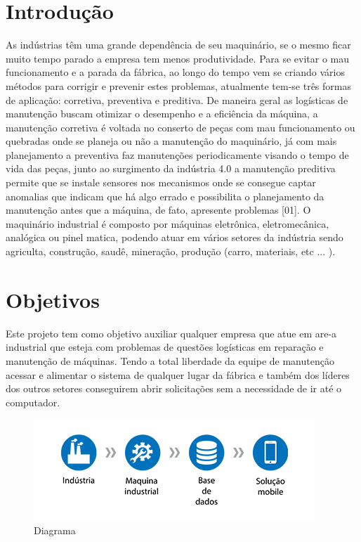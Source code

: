 \documentclass[%
  a4paper,%
  12pt,%
  english,%
  brazilian,%
]{article}
\begin{document}
\section{Introdução}%
As indústrias têm uma grande dependência de seu maquinário, se o mesmo ficar muito tempo parado a empresa tem menos produtividade. Para se evitar o mau funcionamento e a parada da fábrica, ao longo do tempo vem se criando vários métodos para corrigir e prevenir estes problemas, atualmente tem-se três formas de aplicação: corretiva, preventiva e preditiva. De maneira geral as logísticas de manutenção buscam otimizar o desempenho e a eficiência da máquina, a manutenção corretiva é voltada no conserto de peças com mau funcionamento ou quebradas onde se planeja ou não a manutenção do maquinário, já com mais planejamento a preventiva faz manutenções periodicamente visando o tempo de vida das peças, junto ao surgimento da indústria 4.0 a manutenção preditiva permite que se instale sensores nos mecanismos onde se consegue captar anomalias que indicam que há algo errado e possibilita o planejamento da manutenção antes que a máquina, de fato, apresente problemas [01]. O maquinário industrial é composto por máquinas eletrônica, eletromecânica, analógica ou pinel matica, podendo atuar em vários setores da indústria sendo agriculta, construção, saudê, mineração, produção (carro, materiais, etc ... ).

\section{Objetivos}%
Este projeto tem como objetivo auxiliar qualquer empresa que atue em are-a industrial que esteja com problemas de questões logísticas em reparação e manutenção de máquinas. Tendo a total liberdade da equipe de manutenção acessar e alimentar o sistema de qualquer lugar da fábrica e também dos líderes dos outros setores conseguirem abrir solicitações sem a necessidade de ir até o computador.



\begin{figure}[!htb]
\includegraphics[width = 0.95\linewidth]{Figures/1.png}
\caption{Diagrama}%
\end{figure}
\end{document}

